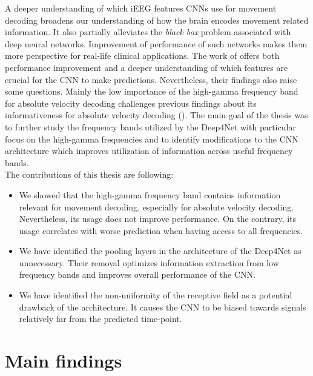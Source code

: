 

A deeper understanding of which iEEG features CNNs use for movement decoding broadens our understanding of how the brain encodes movement related information.
It also partially alleviates the \textit{black box} problem associated with deep neural networks.
Improvement of performance of such networks makes them more perspective for real-life clinical applications.
The work of \cite{Hammer-2021} offers both performance improvement and a deeper understanding of which features are crucial for the CNN to make predictions.
Nevertheless, their findings also raise some questions.
Mainly the low importance of the high-gamma frequency band for absolute velocity decoding challenges previous findings about its informativeness for absolute velocity decoding (\cite{hammer-predominance-2016}).
The main goal of the thesis was to further study the frequency bands utilized by the Deep4Net with particular focus on the high-gamma frequencies and to identify modifications to the CNN architecture which improves utilization of information across useful frequency bands. \\

The contributions of this thesis are following:
\begin{itemize}
    \item We showed that the high-gamma frequency band contains information relevant for movement decoding, especially for absolute velocity decoding. Nevertheless, its usage does not improve performance. On the contrary, its usage correlates with worse prediction when having access to all frequencies.
    \item We have identified the pooling layers in the architecture of the Deep4Net as unnecessary. Their removal optimizes information extraction from low frequency bands and improves overall performance of the CNN.
    \item We have identified the non-uniformity of the receptive field as a potential drawback of the architecture. It causes the CNN to be biased towards signals relatively far from the predicted time-point.
\end{itemize}


\section*{Main findings}


